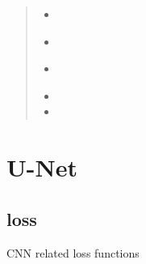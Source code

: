 \documentclass[letterpaper,10pt,english]{sphinxmanual}
\begin{document}
\begin{fulllineitems}
\begin{quote}
\begin{description}
\begin{itemize}
\begin{itemize}
\item {} 
{\hyperref[\detokenize{index:unet.loss.multi_loss_fun}]{}}

\item {} 
{\hyperref[\detokenize{index:util.load_data.load_train_data}]{}}

\item {} 
{\hyperref[\detokenize{index:util.load_batch.load_batch_parallel}]{}}

\item {} 

\item {} 

\end{itemize}


\end{itemize}

\end{description}\end{quote}

\end{fulllineitems}



\chapter{U-Net}
\label{\detokenize{index:u-net}}

\section{loss}
\label{\detokenize{index:module-unet.loss}}\label{\detokenize{index:loss}}
CNN related loss functions
\end{document}
